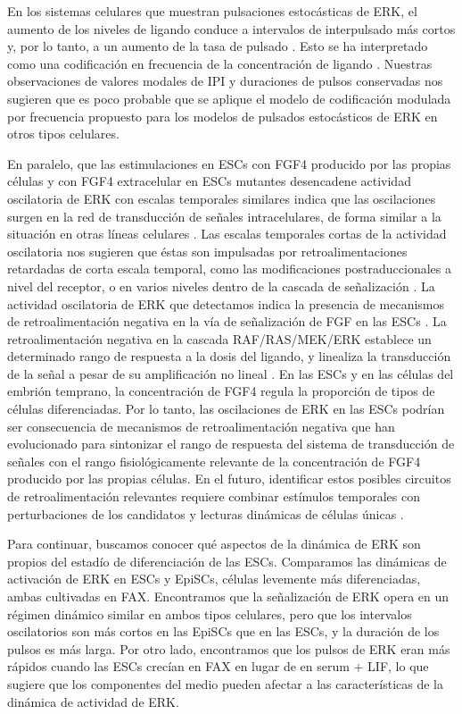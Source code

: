 \documentclass[./main.tex]{subfiles}
\begin{document}
En los sistemas celulares que muestran pulsaciones estocásticas de ERK, el aumento de los niveles de ligando conduce a intervalos de interpulsado más cortos y, por lo tanto, a un aumento de la tasa de pulsado \cite{Albeck2013}. Esto se ha interpretado como una codificación en frecuencia de la concentración de ligando \cite{Li2019}. Nuestras observaciones de valores modales de IPI y duraciones de pulsos conservadas nos sugieren que es poco probable que se aplique el modelo de codificación modulada por frecuencia propuesto para los modelos de pulsados estocásticos de ERK en otros tipos celulares.

En paralelo, que las estimulaciones en ESCs con FGF4 producido por las propias células y con FGF4 extracelular en ESCs mutantes desencadene actividad oscilatoria de ERK con escalas temporales similares indica que las oscilaciones surgen en la red de transducción de señales intracelulares, de forma similar a la situación en otras líneas celulares \cite{Sparta2015}. Las escalas temporales cortas de la actividad oscilatoria nos sugieren que éstas son impulsadas por retroalimentaciones retardadas de corta escala temporal, como las modificaciones postraduccionales a nivel del receptor, o en varios niveles dentro de la cascada de señalización  \cite{Sparta2015,Lake2016,Lemmon2016,Casani2022}. La actividad oscilatoria de ERK que detectamos indica la presencia de mecanismos de retroalimentación negativa en la vía de señalización de FGF en las ESCs \cite{Novak2008}. La retroalimentación negativa en la cascada RAF/RAS/MEK/ERK establece un determinado rango de respuesta a la dosis del ligando, y linealiza la transducción de la señal a pesar de su amplificación no lineal \cite{Sturm2010}. En las ESCs y en las células del embrión temprano, la concentración de FGF4 regula la proporción de tipos de células diferenciadas. Por lo tanto, las oscilaciones de ERK en las ESCs podrían ser consecuencia de mecanismos de retroalimentación negativa que han evolucionado para sintonizar el rango de respuesta del sistema de transducción de señales con el rango fisiológicamente relevante de la concentración de FGF4 producido por las propias células. En el futuro, identificar estos posibles circuitos de retroalimentación relevantes requiere combinar estímulos temporales con perturbaciones de los candidatos y lecturas dinámicas de células únicas \cite{Blum2019}.


Para continuar, buscamos conocer qué aspectos de la dinámica de ERK son propios del estadío de diferenciación de las ESCs. Comparamos las dinámicas de activación de ERK en ESCs y EpiSCs, células levemente más diferenciadas, ambas cultivadas en FAX. Encontramos que la señalización de ERK opera en un régimen dinámico similar en ambos tipos celulares, pero que los intervalos oscilatorios son más cortos en las EpiSCs que en las ESCs, y la duración de los pulsos es más larga. Por otro lado, encontramos que los pulsos de ERK eran más rápidos cuando las ESCs crecían en FAX en lugar de en serum + LIF, lo que sugiere que los componentes del medio pueden afectar a las características de la dinámica de actividad de ERK.
\end{document}

